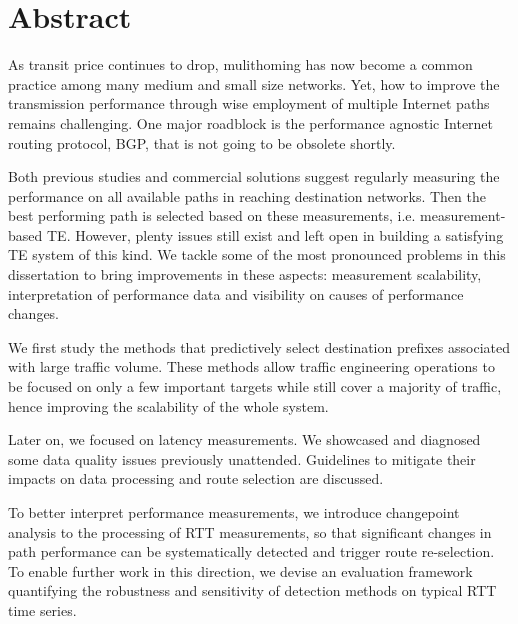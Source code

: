 \begingroup
\let\clearpage\relax
\let\cleardoublepage\relax
\let\cleardoublepage\relax

\chapter*{Abstract}

As transit price continues to drop, mulithoming has now become a common practice among many medium and small size networks. Yet, how to improve the transmission performance through wise employment of multiple Internet paths remains challenging. One major roadblock is the performance agnostic Internet routing protocol, \acf{BGP}, that is not going to be obsolete shortly.

Both previous studies and commercial solutions suggest regularly measuring the performance on all available paths in reaching destination networks.
Then the best performing path is selected based on these measurements, i.e. measurement-based \acf{TE}.
However, plenty issues still exist and left open in building a satisfying TE system of this kind.
We tackle some of the most pronounced problems in this dissertation to bring improvements in these aspects: measurement scalability, interpretation of performance data and visibility on causes of performance changes. 

We first study the methods that predictively select destination prefixes associated with large traffic volume.
These methods allow traffic engineering operations to be focused on only a few important targets while still cover a majority of traffic, hence improving the scalability of the whole system.

Later on, we focused on latency measurements. 
We showcased and diagnosed some data quality issues previously unattended.
Guidelines to mitigate their impacts on data processing and route selection are discussed.

To better interpret performance measurements, we introduce changepoint analysis to the processing of \acf{RTT} measurements, so that significant changes in path performance can be systematically detected and trigger route re-selection. 
To enable further work in this direction, we devise an evaluation framework quantifying the robustness and sensitivity of detection methods on typical RTT time series.

